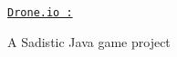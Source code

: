 \href{https://drone.io/github.com/minijackson/Philophobia/latest}{\tt Drone.\-io \-:} 

A Sadistic Java game project 